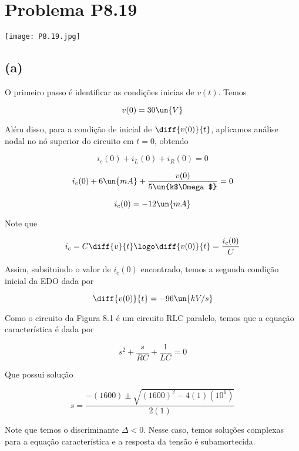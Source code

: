 
\section*{Problema P8.19}

\renewcommand*\thesection{8.19}

\begin{center}
    \texttt{[image: P8.19.jpg]}
\end{center}

\subsection*{(a)}

O primeiro passo é identificar as condições inicias de $v(t)$. Temos

\begin{equation}\label{eq:8.19.1}
    v(0) = 30 \un{V}
\end{equation}

Além disso, para a condição de inicial de $\diff{v(0)}{t}$, aplicamos análise nodal no nó superior do circuito em $t=0$, obtendo

\[ i_c(0) + i_L(0) + i_R(0) = 0  \]

\[ i_c(0) + 6 \un{mA} + \frac{v(0)}{5\un{k$\Omega$}} = 0  \]

\[ i_c(0) = - 12 \un{mA}  \]

Note que

\[ i_c = C\diff{v}{t} \logo \diff{v(0)}{t} = \frac{i_c(0)}{C} \]

Assim, subsituindo o valor de $i_c(0)$ encontrado, temos a segunda condição inicial da EDO dada por

\begin{equation}\label{eq:8.19.2}
    \diff{v(0)}{t} = -96 \un{kV/s}
\end{equation}

Como o circuito da Figura 8.1 é um circuito RLC paralelo, temos que a equação característica é dada por 

\begin{equation}\label{eq:8.19.3}
    s^2 + \frac{s}{RC} + \frac{1}{LC} = 0
\end{equation}

Que possui solução   

\[ s = \frac{-(1600) \pm \sqrt{(1600)^2 - 4(1)(10^6)}}{2(1)} \]

Note que temos o discriminante $\Delta < 0$. Nesse caso, temos soluções complexas para a equação característica e a resposta da tensão é subamortecida.

